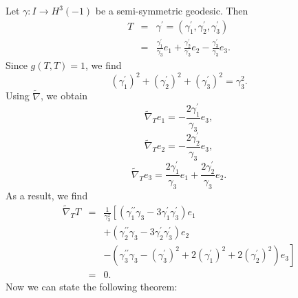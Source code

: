 \documentclass{amsart}
\theoremstyle{plain}
\theoremstyle{definition}
\theoremstyle{remark}
\numberwithin{equation}{section}
\begin{document}
Let $\gamma :I\rightarrow H^{3}\left( -1\right) $ be a semi-symmetric
geodesic. Then%
\begin{eqnarray*}
T &=&\gamma ^{\prime }=\left( \gamma _{1}^{\prime },\gamma _{2}^{\prime
},\gamma _{3}^{\prime }\right)  \\
&=&\frac{\gamma _{1}^{\prime }}{\gamma _{3}}e_{1}+\frac{\gamma _{2}^{\prime }%
}{\gamma _{3}}e_{2}-\frac{\gamma _{3}^{\prime }}{\gamma _{3}}e_{3}.
\end{eqnarray*}%
Since $g\left( T,T\right) =1$, we find%
\begin{equation}
\left( \gamma _{1}^{\prime }\right) ^{2}+\left( \gamma _{2}^{\prime }\right)
^{2}+\left( \gamma _{3}^{\prime }\right) ^{2}=\gamma _{3}^{2}.
\label{unitH3}
\end{equation}%
Using $\widetilde{\nabla }$, we obtain%
\begin{equation*}
\widetilde{\nabla }_{T}e_{1}=-\frac{2\gamma _{1}^{\prime }}{\gamma _{3}}%
e_{3},
\end{equation*}%
\begin{equation*}
\widetilde{\nabla }_{T}e_{2}=-\frac{2\gamma _{2}^{\prime }}{\gamma _{3}}%
e_{3},
\end{equation*}%
\begin{equation*}
\widetilde{\nabla }_{T}e_{3}=\frac{2\gamma _{1}^{\prime }}{\gamma _{3}}e_{1}+%
\frac{2\gamma _{2}^{\prime }}{\gamma _{3}}e_{2}.
\end{equation*}%
As a result, we find%
\begin{eqnarray*}
\widetilde{\nabla }_{T}T &=&\frac{1}{\gamma _{3}^{2}}\left[ \left( \gamma
_{1}^{\prime \prime }\gamma _{3}-3\gamma _{1}^{\prime }\gamma _{3}^{\prime
}\right) e_{1}\right.  \\
&&+\left( \gamma _{2}^{\prime \prime }\gamma _{3}-3\gamma _{2}^{\prime
}\gamma _{3}^{\prime }\right) e_{2} \\
&&\left. -\left( \gamma _{3}^{\prime \prime }\gamma _{3}-\left( \gamma
_{3}^{\prime }\right) ^{2}+2\left( \gamma _{1}^{\prime }\right) ^{2}+2\left(
\gamma _{2}^{\prime }\right) ^{2}\right) e_{3}\right]  \\
&=&0.
\end{eqnarray*}%
Now we can state the following theorem:
\end{document}
